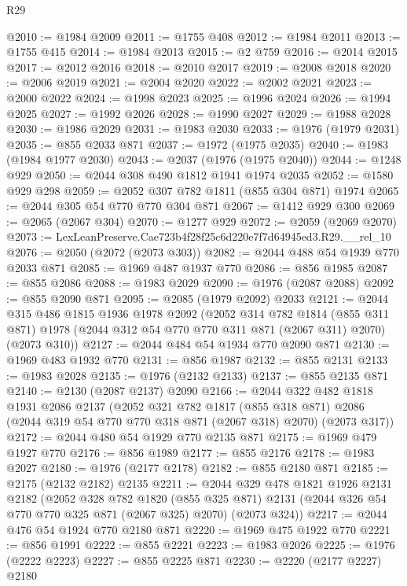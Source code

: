 \begin{lexlean}{R29}
\begin{coremodule}
@2010 := @1984 @2009
@2011 := @1755 @408
@2012 := @1984 @2011
@2013 := @1755 @415
@2014 := @1984 @2013
@2015 := @2 @759
@2016 := @2014 @2015
@2017 := @2012 @2016
@2018 := @2010 @2017
@2019 := @2008 @2018
@2020 := @2006 @2019
@2021 := @2004 @2020
@2022 := @2002 @2021
@2023 := @2000 @2022
@2024 := @1998 @2023
@2025 := @1996 @2024
@2026 := @1994 @2025
@2027 := @1992 @2026
@2028 := @1990 @2027
@2029 := @1988 @2028
@2030 := @1986 @2029
@2031 := @1983 @2030
@2033 := @1976 (@1979 @2031)
@2035 := @855 @2033 @871
@2037 := @1972 (@1975 @2035)
@2040 := @1983 (@1984 @1977 @2030)
@2043 := @2037 (@1976 (@1975 @2040))
@2044 := @1248 @929
@2050 := @2044 @308 @490 @1812 @1941 @1974 @2035
@2052 := @1580 @929 @298
@2059 := @2052 @307 @782 @1811 (@855 @304 @871) @1974
@2065 := @2044 @305 @54 @770 @770 @304 @871
@2067 := @1412 @929 @300
@2069 := @2065 (@2067 @304)
@2070 := @1277 @929
@2072 := @2059 (@2069 @2070)
@2073 := LexLeanPreserve.Cae723b4f28f25c6d220e7f7d64945ed3.R29.__rel_10
@2076 := @2050 (@2072 (@2073 @303))
@2082 := @2044 @488 @54 @1939 @770 @2033 @871
@2085 := @1969 @487 @1937 @770
@2086 := @856 @1985
@2087 := @855 @2086
@2088 := @1983 @2029
@2090 := @1976 (@2087 @2088)
@2092 := @855 @2090 @871
@2095 := @2085 (@1979 @2092) @2033
@2121 := @2044
    @315
    @486
    @1815
    @1936
    @1978
    @2092
    (@2052
      @314
      @782
      @1814
      (@855 @311 @871)
      @1978
      (@2044 @312 @54 @770 @770 @311 @871 (@2067 @311) @2070)
      (@2073 @310))
@2127 := @2044 @484 @54 @1934 @770 @2090 @871
@2130 := @1969 @483 @1932 @770
@2131 := @856 @1987
@2132 := @855 @2131
@2133 := @1983 @2028
@2135 := @1976 (@2132 @2133)
@2137 := @855 @2135 @871
@2140 := @2130 (@2087 @2137) @2090
@2166 := @2044
    @322
    @482
    @1818
    @1931
    @2086
    @2137
    (@2052
      @321
      @782
      @1817
      (@855 @318 @871)
      @2086
      (@2044 @319 @54 @770 @770 @318 @871 (@2067 @318) @2070)
      (@2073 @317))
@2172 := @2044 @480 @54 @1929 @770 @2135 @871
@2175 := @1969 @479 @1927 @770
@2176 := @856 @1989
@2177 := @855 @2176
@2178 := @1983 @2027
@2180 := @1976 (@2177 @2178)
@2182 := @855 @2180 @871
@2185 := @2175 (@2132 @2182) @2135
@2211 := @2044
    @329
    @478
    @1821
    @1926
    @2131
    @2182
    (@2052
      @328
      @782
      @1820
      (@855 @325 @871)
      @2131
      (@2044 @326 @54 @770 @770 @325 @871 (@2067 @325) @2070)
      (@2073 @324))
@2217 := @2044 @476 @54 @1924 @770 @2180 @871
@2220 := @1969 @475 @1922 @770
@2221 := @856 @1991
@2222 := @855 @2221
@2223 := @1983 @2026
@2225 := @1976 (@2222 @2223)
@2227 := @855 @2225 @871
@2230 := @2220 (@2177 @2227) @2180

\end{coremodule}
\end{lexlean}
